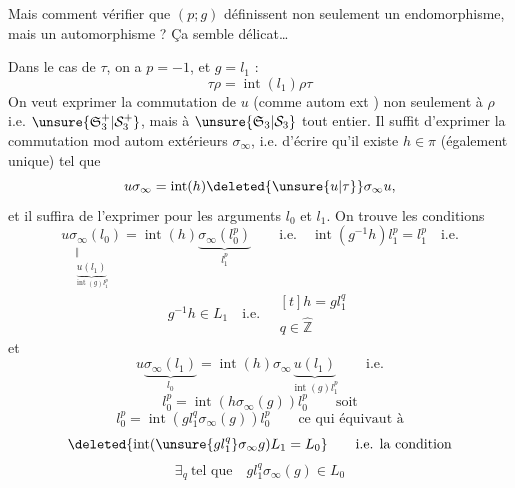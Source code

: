 Mais comment vérifier que $(p;g)$ définissent non seulement un endomorphisme, mais un automorphisme ? Ça semble délicat\ldots

Dans le cas de $\tau$, on a $p=-1$, et $g=l_1$ :
\[
\tau\rho=\operatorname{int}(l_1)\rho\tau
\]
On veut exprimer la commutation de $u$ (comme autom ext ) non seulement à $\rho$ i.e. $\unsure{\mathfrak S_3^+|\mathcal S_3^+}$,
mais à $\unsure{\mathfrak S_3|\mathcal S_3}$ tout entier. Il suffit d'exprimer la commutation mod autom extérieurs  $\sigma_\infty$, i.e. d'écrire qu'il existe $h\in\pi$ (également unique) tel que
\[
u\sigma_\infty=\operatorname{int}(h)\deleted{\unsure{u|\tau}}\sigma_\infty u,
\]
et il suffira de l'exprimer pour les arguments $l_0$ et $l_1$. On trouve les conditions
\[
\underset{\substack{\Vert\\\underbrace{u(l_1)}_{\operatorname{int}(g)l_1^p}}}{u\sigma_\infty(l_0)}=\operatorname{int}(h)\underbrace{\sigma_\infty(l_0^p)}_{l_1^p}
\qquad\text{i.e.}\quad\operatorname{int}(g^{-1}h)l_1^p=l_1^p\quad\text{i.e.}
\]
\[
g^{-1}h\in L_1\quad\text{i.e.}\quad \begin{gathered}[t]h=gl_1^q\\q\in\hat{\mathbb Z}\end{gathered}
\]
et
\[
u\underbrace{\sigma_\infty(l_1)}_{l_0}=\operatorname{int}(h)\sigma_\infty\underbrace{u(l_1)}_{\operatorname{int}(g)l_1^p}\qquad\text{i.e.}
\]
\[
l_0^p=\operatorname{int}(h\sigma_\infty(g))l_0^p\qquad\text{soit}
\]
\[
l_0^p=\operatorname{int}(gl_1^q\sigma_\infty(g))l_0^p\qquad\text{ce qui équivaut à}
\]
\[
\deleted{\operatorname{int}(\unsure{gl_1^q}\sigma_\infty g)L_1=L_0}\qquad\text{i.e. la condition}
\]
\[
\exists_q\ \text{tel que}\quad gl_1^q\sigma_\infty(g)\in L_0
\]
